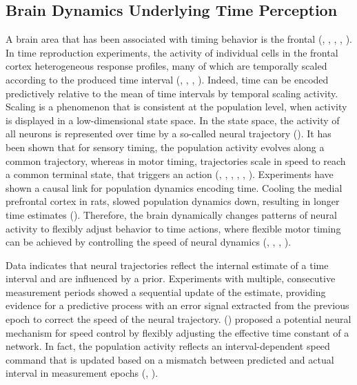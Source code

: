 \documentclass[10pt]{article}
\begin{document}

\subsection{Brain Dynamics Underlying Time Perception}
A brain area that has been associated with timing behavior is the frontal (\cite{Shima2000}, \cite{Lewis2004}, \cite{Genovesio2006}, \cite{Emmons2017}, \cite{Wang2018}).
In time reproduction experiments, the activity of individual cells in the frontal cortex heterogeneous response profiles, many of which are temporally scaled according to the produced time interval (\cite{Henke2021}, \cite{Sohn2019}, \cite{Remington2018}, \cite{Wang2018}).
Indeed, time can be encoded predictively relative to the mean of time intervals by temporal scaling activity.
Scaling is a phenomenon that is consistent at the population level, when activity is displayed in a low-dimensional state space. In the state space, the activity of all neurons is represented over time by a so-called neural trajectory (\cite{Cueva2022}).
It has been shown that for sensory timing, the population activity evolves along a common trajectory, whereas in motor timing, trajectories scale in speed to reach a common terminal state, that triggers an action (\cite{Mita2009}, \cite{Murakami2014}, \cite{Wang2018}, \cite{Sohn2019}, \cite{Henke2021}, \cite{Meirhaeghe2021}).
Experiments have shown a causal link for population dynamics encoding time. Cooling the  medial prefrontal cortex in rats, slowed population dynamics down, resulting in longer time estimates (\cite{Xu2014}). 
Therefore, the brain dynamically changes patterns of neural activity to flexibly adjust behavior to time actions, where flexible motor timing can be achieved by controlling the speed of neural dynamics (\cite{Remington2018}, \cite{Wang2018}, \cite{Sohn2019}, \cite{Tsao2022}).

Data indicates that neural trajectories reflect the internal estimate of a time interval and are influenced by a prior.
Experiments with multiple, consecutive measurement periods showed a sequential update of the estimate, providing evidence for a predictive process with an error signal extracted from the previous epoch to correct the speed of the neural trajectory.
\citeauthor{Wang2018} (\citeyear{Wang2018}) proposed a potential neural mechanism for speed control by flexibly adjusting the effective time constant of a network.
In fact, the population activity reflects an interval-dependent speed command that is updated based on a mismatch between predicted and actual interval in measurement epochs (\cite{Wang2018}, \cite{Egger2019}). 
\end{document}

